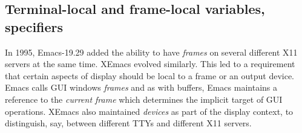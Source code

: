 \documentclass[format=acmsmall, review]{acmart}
\begin{document}












\subsection{Terminal-local and frame-local variables, specifiers}

In 1995, Emacs-19.29 added the ability to have \emph{frames} on
several different X11 servers at the same time.  XEmacs evolved
similarly.  This led to a requirement that certain aspects of display
should be local to a frame or an output device.  Emacs calls GUI
windows \emph{frames} and as with buffers, Emacs maintains a reference
to the \emph{current frame} which determines the implicit target of
GUI operations.  XEmacs also maintained \emph{devices} as part of
the display context, to distinguish, say, between different TTYs and
different X11 servers.
\end{document}
